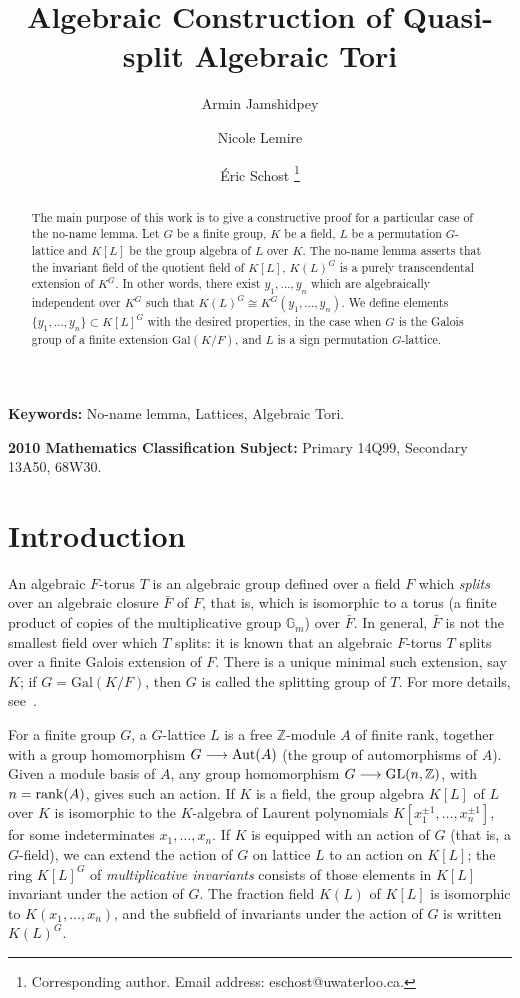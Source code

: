 \documentclass[12pt]{article}
\title{Algebraic Construction of Quasi-split Algebraic Tori}
\author[1]{Armin Jamshidpey}
\author[2]{Nicole Lemire}
\author[1]{\'Eric Schost \footnote{Corresponding author. Email address: eschost@uwaterloo.ca.}}
\affil[1]{David Cheriton School of Computer Science, University of Waterloo}
\affil[2]{Department of Mathematics, University of Western Ontario}
\theoremstyle{plain}
\newcommand{\Z}{\ensuremath{\mathbb{Z}}}
\begin{document}
\maketitle


\begin{abstract}

The main purpose of this work is to give a constructive proof for a 
particular case of the no-name lemma. Let $G$ be a
finite group, $K$ be a field, $L$ be a permutation $G$-lattice 
and $K[L]$ be the group algebra of $L$ over
$K$. The no-name lemma asserts that the invariant field of the
quotient field of $K[L]$, $K(L)^G$ is a purely transcendental
extension of $K^G$. In other words, there exist $y_1, \ldots , y_n$
which are algebraically independent over $K^G$ such that $K(L)^G \cong
K^G(y_1, \ldots , y_n)$.  We define elements $\lbrace y_1, \ldots, y_n
\rbrace \subset K[L]^G$ with the desired properties, in the case when
$G$ is the Galois group of a finite extension $\mathrm{Gal}(K/F)$, and
$L$ is a sign permutation $G$-lattice.
\end{abstract}

 \textbf{Keywords:} No-name lemma, Lattices, Algebraic Tori.
 
 \textbf{2010 Mathematics Classification Subject:} Primary 14Q99, Secondary 13A50, 68W30.

\section{Introduction}


An algebraic $F$-torus $T$ is an algebraic group defined over a field
$F$ which {\em splits} over an algebraic closure $\bar F$ of $F$, that
is, which is isomorphic to a torus (a finite product of copies of the
multiplicative group $\mathbb{G}_m$) over $\bar{F}$. In general,
$\bar{F}$ is not the smallest field over which $T$ splits: it is known
that an algebraic $F$-torus $T$ splits over a finite Galois extension
of $F$. There is a unique minimal such extension, say $K$; if $G =
\mathrm{Gal}(K/F)$, then $G$ is called the splitting group of $T$. For
more details, 
see~\cite[p. 27]{Voskresenskii}.

For a finite group $G$, a $G$-lattice $L$ is a free $\Z$-module $A$ of
finite rank, together with a group homomorphism $G \longrightarrow
{\rm Aut}(A)$ (the group of automorphisms of $A$). Given a module
basis of $A$, any group homomorphism $G \longrightarrow {\rm
  GL}(n,\Z)$, with $n={\rm rank}(A)$, gives such an action.  If $K$ is
a field, the group algebra $K[L]$ of $L$ over $K$ is isomorphic to the
$K$-algebra of Laurent polynomials $K[x_1^{\pm 1},\dots,x_n^{\pm 1}]$,
for some indeterminates $x_1,\dots,x_n$.  If $K$ is equipped with an
action of $G$ (that is, a $G$-field), we can extend the action of $G$
on lattice $L$ to an action on $K[L]$; the ring $K[L]^G$ of {\em
  multiplicative invariants} consists of those elements in $K[L]$
invariant under the action of $G$. The fraction field $K(L)$ of $K[L]$
is isomorphic to $K(x_1,\dots,x_n)$, and the subfield of invariants
under the action of $G$ is written $K(L)^G$.
\end{document}
